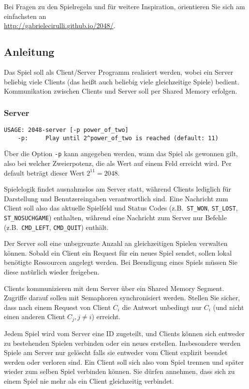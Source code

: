 Bei Fragen zu den Spielregeln und für weitere Inspiration, orientieren Sie sich
am einfachsten an\\
\url{http://gabrielecirulli.github.io/2048/}.


\subsection*{Anleitung}

Das Spiel soll als Client/Server Programm realisiert werden, wobei ein Server
beliebig viele Clients (das heißt auch beliebig viele gleichzeitige Spiele)
bedient. Kommunikation zwischen Clients und Server soll per Shared Memory
erfolgen.

\subsubsection*{Server}
\label{sec:server}

\begin{verbatim}
USAGE: 2048-server [-p power_of_two]
    -p:     Play until 2^power_of_two is reached (default: 11)
\end{verbatim}

Über die Option \verb|-p| kann angegeben werden, wann das Spiel als gewonnen
gilt, also bei welcher Zweierpotenz, die als Wert auf einem Feld erreicht wird.
Per default beträgt dieser Wert $2^{11} = 2048$.

Spielelogik findet ausnahmslos am Server statt, während Clients lediglich für
Darstellung und Benutzereingaben verantwortlich sind. Eine Nachricht zum Client
soll also das aktuelle Spielfeld und Status Codes (z.B.\ \verb|ST_WON|,
\verb|ST_LOST|, \verb|ST_NOSUCHGAME|) enthalten, während eine Nachricht zum
Server nur Befehle (z.B.\ \verb|CMD_LEFT|, \verb|CMD_QUIT|) enthält.

Der Server soll eine unbegrenzte Anzahl an gleichzeitigen Spielen verwalten
können.  Sobald ein Client ein Request für ein neues Spiel sendet, sollen lokal
benötigte Ressourcen angelegt werden. Bei Beendigung eines Spiels müssen Sie
diese natürlich wieder freigeben.

Clients kommunizieren mit dem Server über ein Shared Memory Segment. Zugriffe
darauf sollen mit Semaphoren synchronisiert werden. Stellen Sie sicher, dass
nach einem Request von Client $C_i$ die Antwort unbedingt nur $C_i$ (und nicht
einen anderen Client $C_j, j \neq i$) erreicht.

Jedem Spiel wird vom Server eine ID zugeteilt, und Clients können sich entweder
zu bestehenden Spielen verbinden oder ein neues erstellen. Insbesondere werden
Spiele am Server nur gelöscht falls sie entweder vom Client explizit beendet
werden oder verloren sind. Ein Client soll sich also vom Spiel trennen und
später wieder zum selben Spiel verbinden können. Sie dürfen annehmen, dass sich
zu einem Spiel nie mehr als ein Client gleichzeitig verbindet.


